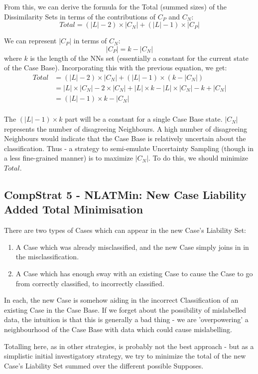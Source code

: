 \documentclass[a4paper,11pt]{report}
\begin{document}
From this, we can derive the formula for the Total (summed sizes) of the Dissimilarity Sets in terms of the contributions of $C_{P}$ and $C_{N}$:
\[ Total= (|L| - 2)\times |C_{N}| +(|L| - 1)\times |C_{P}|  \] 

We can represent $|C_{P}|$ in terms of $C_{N}$:
\[ |C_{P}| = k -  |C_{N}| \]
where $k$ is the length of the NNs set (essentially a constant for the current state of the Case Base). Incorporating this with the previous equation, we get:
\begin{align*}
Total &= (|L| - 2)\times |C_{N}| +(|L| - 1)\times (k - |C_{N}|) \\
&= |L| \times |C_{N}| - 2\times|C_{N}| + |L|\times k - |L| \times |C_{N}| - k + |C_{N}| \\
&= (|L| - 1) \times k - |C_{N}| \\
\end{align*} 

The $ (|L| - 1) \times k $ part will be a constant for a single Case Base state. $|C_{N}|$ represents the number of disagreeing Neighbours. A high number of disagreeing Neighbours would indicate that the Case Base is relatively uncertain about the classification. Thus - a strategy to semi-emulate Uncertainty Sampling (though in a less fine-grained manner) is to maximize $|C_{N}|$. To do this, we should minimize $Total$.

\subsection{CompStrat 5 - NLATMin: New Case Liability Added Total Minimisation}
There are two types of Cases which can appear in the new Case's Liability Set:
\begin{enumerate}
	\item A Case which was already misclassified, and the new Case simply joins in in the misclassification.
	\item A Case which has enough sway with an existing Case to cause the Case to go from correctly classified, to incorrectly classified.
\end{enumerate}

In each, the new Case is somehow aiding in the incorrect Classification of an existing Case in the Case Base. If we forget about the possibility of mislabelled data, the intuition is that this is generally a bad thing - we are 'overpowering' a neighbourhood of the Case Base with data which could cause mislabelling.

Totalling here, as in other strategies, is probably not the best approach - but as a simplistic initial investigatory strategy, we try to minimize the total of the new Case's Liability Set summed over the different possible Supposes.
\end{document}
